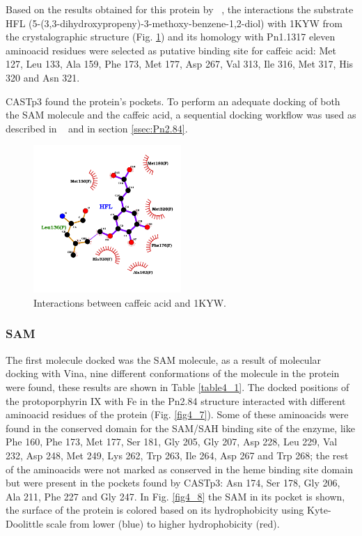 \documentclass[12pt]{article}
\newcommand{\textcite}[1]{\citeauthor{#1}~\citeyear{#1}}
\begin{document}
	Based on the results obtained for this protein by \textcite{caff}, the interactions the substrate HFL (5-(3,3-dihydroxypropeny)-3-methoxy-benzene-1,2-diol) with 1KYW from the crystalographic structure (Fig. \ref{fig4_6}) and its homology with Pn1.1317 eleven aminoacid residues were selected as putative binding site for caffeic acid: Met 127, Leu 133, Ala 159, Phe 173, Met 177, Asp 267, Val 313, Ile 316, Met 317, His 320 and Asn 321.
	
	CASTp3 found the protein's pockets. \cite{castp} To perform an adequate docking of both the SAM molecule and the caffeic acid, a sequential docking workflow was used as described in \textcite{sequential} and in section \ref{ssec:Pn2.84}.
	
	\newpage
	
	\FloatBarrier
	\begin{figure}
		\centering
		\includegraphics[width=0.5\textwidth]{../4/Phylogeny/hfl.png}
		\caption{\centering Interactions between caffeic acid and 1KYW.}
		\label{fig4_6}
	\end{figure}
	\FloatBarrier
	
	\subsubsection{SAM}
	
	The first molecule docked was the SAM molecule, as a result of molecular docking with Vina, nine different conformations of the molecule in the protein were found, these results are shown in Table \ref{table4_1}. The docked positions of the protoporphyrin IX with Fe in the Pn2.84 structure interacted with different aminoacid residues of the protein (Fig. \ref{fig4_7}). Some of these aminoacids were found in the conserved domain for the SAM/SAH binding site of the enzyme, like Phe 160, Phe 173, Met 177, Ser 181, Gly 205, Gly 207, Asp 228, Leu 229, Val 232, Asp 248, Met 249, Lys 262, Trp 263, Ile 264, Asp 267 and Trp 268; the rest of the aminoacids were not marked as conserved in the heme binding site domain but were present in the pockets found by CASTp3: Asn 174, Ser 178, Gly 206, Ala 211, Phe 227 and Gly 247. In Fig. \ref{fig4_8} the SAM in its pocket is shown, the surface of the protein is colored based on its hydrophobicity using Kyte-Doolittle scale from lower (blue) to higher hydrophobicity (red).
	
\end{document}
